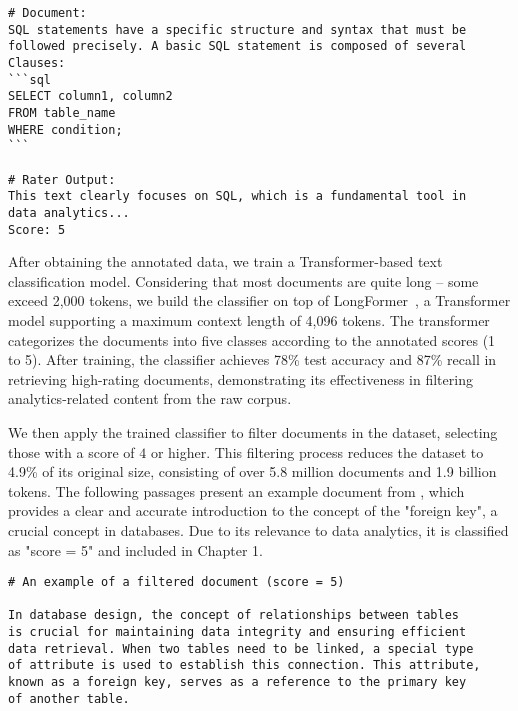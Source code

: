 \begin{tcolorbox}[left=1pt, right=0pt, top=1pt, bottom=1pt]
\begin{verbatim}
# Document: 
SQL statements have a specific structure and syntax that must be 
followed precisely. A basic SQL statement is composed of several 
Clauses:
```sql
SELECT column1, column2
FROM table_name
WHERE condition;
```

# Rater Output:
This text clearly focuses on SQL, which is a fundamental tool in 
data analytics...
Score: 5 
\end{verbatim}
\end{tcolorbox}


 After obtaining the annotated data, we train a Transformer-based text classification model. Considering that most documents are quite long -- some exceed 2,000 tokens, we build the classifier on top of LongFormer~\citep{beltagy2020longformer}, a Transformer model supporting a maximum context length of 4,096 tokens. The transformer categorizes the documents into five classes according to the annotated scores (1 to 5). After training, the classifier achieves 78\% test accuracy and 87\% recall in retrieving high-rating documents, demonstrating its effectiveness in filtering analytics-related content from the raw corpus.

 We then apply the trained classifier to filter documents in the \fineweb dataset, selecting those with a score of $4$ or higher.
This filtering process reduces the dataset to 4.9\% of its original size, consisting of over 5.8 million documents and 1.9 billion tokens.
% 
The following passages present an example document from \fineweb, which provides a clear and accurate introduction to the concept of the "foreign key", a crucial concept in databases. Due to its relevance to data analytics, it is classified as "score = 5" and included in Chapter 1.

\begin{tcolorbox}[left=1pt, right=0pt, top=1pt, bottom=1pt]
\begin{Verbatim}
# An example of a filtered document (score = 5)

In database design, the concept of relationships between tables 
is crucial for maintaining data integrity and ensuring efficient
data retrieval. When two tables need to be linked, a special type 
of attribute is used to establish this connection. This attribute, 
known as a foreign key, serves as a reference to the primary key
of another table.
\end{Verbatim}
\end{tcolorbox} 

